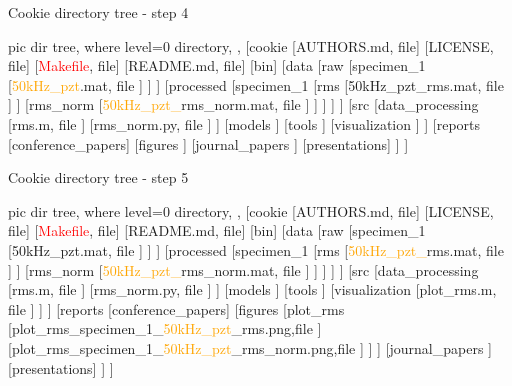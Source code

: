 \documentclass[10pt,aspectratio=169]{beamer} %
\begin{document}
\begin{frame}[t]{Cookie directory tree - step 4}
\centering
	\begin{forest}
		pic dir tree,
		where level=0{}{%
			directory,
		},
		[cookie
		[AUTHORS.md, file]
		[LICENSE, file]
		[\textcolor{red}{Makefile}, file]
		[README.md, file]
		[bin]
		[data
		[raw
			[specimen\_1
				[\textcolor{orange}{50kHz\_pzt}.mat, file
				]
			]
		]
		[processed
			[specimen\_1
				[rms
					[50kHz\_pzt\_rms.mat, file
					]
				]
				[\alert{rms\_norm}
					[\textcolor{orange}{50kHz\_pzt\_}\alert{rms\_norm}.mat, file
					]
				]
			]
		]
		]
		[src
			[data\_processing
				[rms.m, file
				]
				[\alert{rms\_norm}.py, file
				]
			]
			[models
			]
			[tools
			]
			[visualization
			]
		]
		[reports
			[conference\_papers]	
			[figures
			]
			[journal\_papers
			]
			[presentations]
		]
		]
	\end{forest}
\end{frame}
\begin{frame}[t]{Cookie directory tree - step 5}
\centering
	\begin{forest}
		pic dir tree,
		where level=0{}{%
			directory,
		},
		[cookie
		[AUTHORS.md, file]
		[LICENSE, file]
		[\textcolor{red}{Makefile}, file]
		[README.md, file]
		[bin]
		[data
		[raw
			[specimen\_1
				[50kHz\_pzt.mat, file
				]
			]
		]
		[processed
			[specimen\_1
				[rms
					[\textcolor{orange}{50kHz\_pzt\_}\alert{rms}.mat, file
					]
				]
				[rms\_norm
					[\textcolor{orange}{50kHz\_pzt\_}\alert{rms\_norm}.mat, file
					]
				]
			]
		]
		]
		[src
			[data\_processing
				[rms.m, file
				]
				[rms\_norm.py, file
				]
			]
			[models
			]
			[tools
			]
			[visualization
				[\textcolor{logoblue}{plot\_rms}.m, file
				]
			]
		]
		[reports
			[conference\_papers]	
			[figures
				[\textcolor{logoblue}{plot\_rms}
					[\textcolor{logoblue}{plot\_rms}\_specimen\_1\_\textcolor{orange}{50kHz\_pzt}\_\alert{rms}.png,file
					]
					[\textcolor{logoblue}{plot\_rms}\_specimen\_1\_\textcolor{orange}{50kHz\_pzt}\_\alert{rms\_norm}.png,file
					]
				]
			]
			[journal\_papers
			]
			[presentations]
		]
		]
	\end{forest}
\end{frame}
\end{document}

